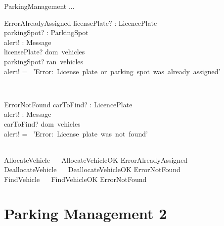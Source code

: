 \documentclass[12pt]{article}
\begin{document}
\begin{spacing}{1.5}
\newpage

\begin{class}{ParkingManagement}
...\\
\begin{op}{ErrorAlreadyAssigned}
licensePlate? : LicencePlate\\
parkingSpot? : ParkingSpot\\
alert! : Message\\
\ST
licensePlate? \in dom~vehicles\\
parkingSpot? \in ran~vehicles\\
alert! = \ 'Error:\ License\ plate\ or\ parking\ spot\ was\ already\ assigned'
\end{op}\\
\begin{op}{ErrorNotFound}
carToFind? : LicencePlate\\
alert! : Message\\
\ST
carToFind? \notin dom~vehicles\\
alert! = \ 'Error:\ License\ plate\ was\ not\ found'
\end{op}\\
AllocateVehicle  \ \mathrel{\widehat{=}} \ AllocateVehicleOK \vee ErrorAlreadyAssigned \\
DeallocateVehicle  \ \mathrel{\widehat{=}} \ DeallocateVehicleOK \vee ErrorNotFound \\
FindVehicle  \ \mathrel{\widehat{=}} \ FindVehicleOK \vee ErrorNotFound \\
\end{class}

\newpage

\section{Parking Management 2}


\end{spacing}
\end{document}
